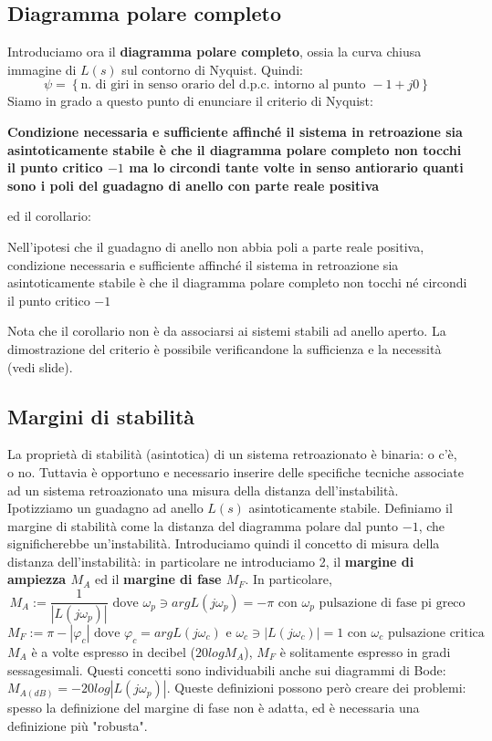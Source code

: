\documentclass[11pt]{article}
\begin{document}
\subsection{Diagramma polare completo}
Introduciamo ora il \textbf{diagramma polare completo}, ossia la curva chiusa immagine di $L(s)$ sul contorno di Nyquist. Quindi:
\begin{displaymath}
    \psi = \left\{\textrm{n. di giri in senso orario del d.p.c. intorno al punto }-1+j0\right\}
\end{displaymath}
Siamo in grado a questo punto di enunciare il criterio di Nyquist:
\begin{center}
    \textbf{Condizione necessaria e sufficiente affinché il sistema in retroazione sia asintoticamente stabile è che il diagramma polare completo non tocchi il punto critico $-1$ ma lo circondi tante volte in senso antiorario quanti sono i poli del guadagno di anello con parte reale positiva}
\end{center}
ed il corollario:
\begin{center}
    Nell'ipotesi che il guadagno di anello non abbia poli a parte reale positiva, condizione necessaria e sufficiente affinché il sistema in retroazione sia asintoticamente stabile è che il diagramma polare completo non tocchi né circondi il punto critico $-1$
\end{center}
Nota che il corollario non è da associarsi ai sistemi stabili ad anello aperto. La dimostrazione del criterio è possibile verificandone la sufficienza e la necessità (vedi slide).
\subsection{Margini di stabilità}
La proprietà di stabilità (asintotica) di un sistema retroazionato è binaria: o c'è, o no. Tuttavia è opportuno e necessario inserire delle specifiche tecniche associate ad un sistema retroazionato una misura della distanza dell'instabilità. Ipotizziamo un guadagno ad anello $L(s)$ asintoticamente stabile. Definiamo il margine di stabilità come la distanza del diagramma polare dal punto $-1$, che significherebbe un'instabilità. Introduciamo quindi il concetto di misura della distanza dell'instabilità: in particolare ne introduciamo 2, il \textbf{margine di ampiezza $M_A$} ed il \textbf{margine di fase $M_F$}. In particolare,
\begin{displaymath}
    M_A := \frac{1}{|L(j\omega_p)|} \textrm{ dove }\omega_p \ni argL(j\omega_p)=-\pi \textrm{ con }\omega_p\textrm{ pulsazione di fase pi greco}
\end{displaymath}
\begin{displaymath}
    M_F := \pi - |\varphi_c| \textrm{ dove }\varphi_c=argL(j\omega_c) \textrm{ e } \omega_c \ni |L(j\omega_c)|=1\textrm{ con }\omega_c\textrm{ pulsazione critica}
\end{displaymath}
$M_A$ è a volte espresso in decibel ($20logM_A$), $M_F$ è solitamente espresso in gradi sessagesimali.
Questi concetti sono individuabili anche sui diagrammi di Bode: $M_{A(dB)} = -20log|L(j\omega_p)|$.
Queste definizioni possono però creare dei problemi: spesso la definizione del margine di fase non è adatta, ed è necessaria una definizione più "robusta".
\end{document}
